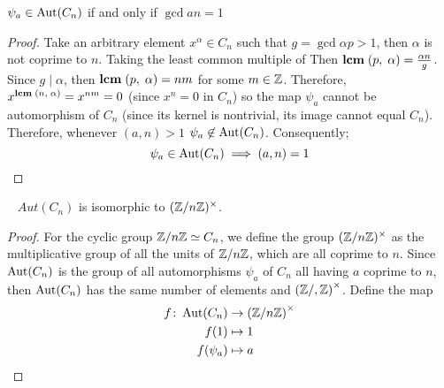 \begin{proposition}
  $\psi_a \in \operatorname{Aut}(C_n)$ if and only if $\gcd{a}{n} = 1$

  \begin{proof}
    Take an arbitrary element $x^\alpha \in C_n$
    such that $g = \gcd{\alpha}{p} > 1$, then $\alpha$ is not coprime to $n$.
    Taking the least common multiple of
    Then $\mathbf{lcm}\;(p,\;\alpha) = \frac{\alpha n}{g}$.
    Since $g \mid \alpha$, then $\mathbf{lcm}\;(p,\;\alpha) = nm$ for some $m \in \mathbb{Z}$.
    Therefore, $x^{\mathbf{lcm}\;(n,\;\alpha)} = x^{nm} = 0$ (since $x^n = 0$ in $C_n$)
    so the map $\psi_a$ cannot be automorphism of $C_n$
    (since its kernel is nontrivial, its image cannot equal $C_n$).
    Therefore, whenever $(a, n) > 1$ $\psi_a \not\in \operatorname{Aut}(C_n)$. Consequently;
    \[ \psi_a \in \operatorname{Aut}(C_n) \implies (a, n) = 1 \]
    
  \end{proof}
\end{proposition}

\begin{proposition}~\label{prop:aut-cyclic}
  $Aut(C_n)$ is isomorphic to $(\mathbb{Z}/n\mathbb{Z})^\times$.

  \begin{proof}
    For the cyclic group $\mathbb{Z}/n\mathbb{Z} \simeq C_n$, we define the group
    ${(\mathbb{Z}/n\mathbb{Z})^\times}$ as the multiplicative  group of all the units of $\mathbb{Z}/n\mathbb{Z}$,
    which are all coprime to $n$.
    Since $\operatorname{Aut}(C_n)$ is the group of all automorphisms $\psi_a$ of $C_n$
    all having $a$ coprime to $n$, then $\operatorname{Aut}(C_n)$ has the same number of elements
    and ${(\mathbb{Z}/,\mathbb{Z})}^\times$. Define the map
    \begin{align*}
      f \colon \operatorname{Aut}(C_n) &\to {(\mathbb{Z}/n\mathbb{Z})}^\times \\
      f(1) &\mapsto 1 \\
      f(\psi_a) &\mapsto a
    \end{align*}
  \end{proof}
\end{proposition}

